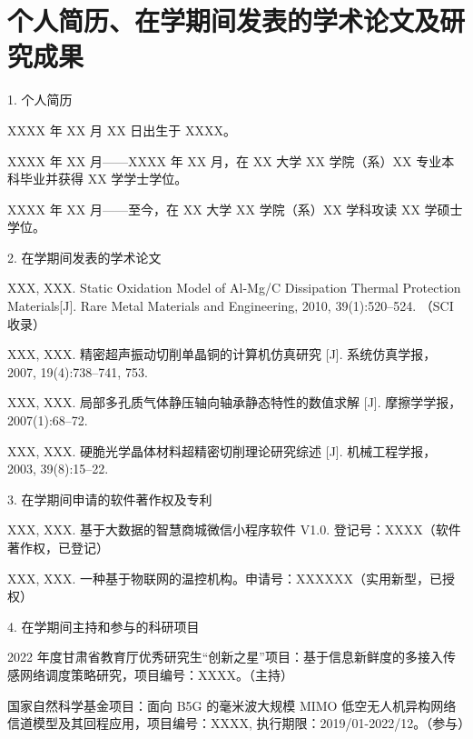 \chapter*{个人简历、在学期间发表的学术论文及研究成果}

\begin{publistsec}{1. 个人简历}
\item XXXX 年 XX 月 XX 日出生于 XXXX。
\item XXXX 年 XX 月——XXXX 年 XX 月，在 XX 大学 XX 学院（系）XX 专业本科毕业并获得 XX 学学士学位。
\item XXXX 年 XX 月——至今，在 XX 大学 XX 学院（系）XX 学科攻读 XX 学硕士学位。
\end{publistsec}

\begin{publistsec}{2. 在学期间发表的学术论文}
\item XXX, XXX. Static Oxidation Model of Al-Mg/C Dissipation Thermal
  Protection Materials[J]. Rare Metal Materials and Engineering,
  2010, 39(1):520–524. （SCI 收录）
\item XXX, XXX. 精密超声振动切削单晶铜的计算机仿真研究 [J]. 系统仿真学报，2007, 19(4):738–741, 753.
\item XXX, XXX. 局部多孔质气体静压轴向轴承静态特性的数值求解 [J]. 摩擦学学报，2007(1):68–72.
\item XXX, XXX. 硬脆光学晶体材料超精密切削理论研究综述 [J]. 机械工程学报，2003, 39(8):15–22.
\end{publistsec}

\begin{publistsec}{3. 在学期间申请的软件著作权及专利}
\item XXX, XXX. 基于大数据的智慧商城微信小程序软件 V1.0. 登记号：XXXX（软件著作权，已登记）
\item XXX, XXX. 一种基于物联网的温控机构。申请号：XXXXXX（实用新型，已授权）
\end{publistsec}

\begin{publistsec}{4. 在学期间主持和参与的科研项目}
\item  2022 年度甘肃省教育厅优秀研究生“创新之星”项目：基于信息新鲜度的多接入传感网络调度策略研究，项目编号：XXXX。（主持）
\item  国家自然科学基金项目：面向 B5G 的毫米波大规模 MIMO 低空无人机异构网络信道模型及其回程应用，项目编号：XXXX,
  执行期限：2019/01-2022/12。（参与）
\end{publistsec}
